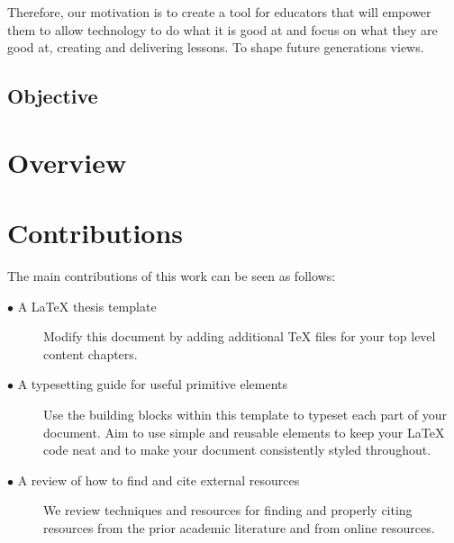	Therefore, our motivation is to create a tool for educators that will empower them to allow technology to do what it is good at and focus on what they are good at, creating and delivering lessons. To shape future generations views.


	\subsection{Objective}
		\label{sec:intro_objective} 



	\section{Overview}  
		\label{sec:intro_overview} 



	\section{Contributions} 
		\label{sec:intro_contribs} 

The main contributions of this work can be seen as follows:

		\begin{description}	

			\item[\(\bullet\) A \LaTeX{} thesis template]\hfill

Modify this document by adding additional \TeX{} files for your top level content chapters. 

			\item[\(\bullet\) A typesetting guide for useful primitive elements]\hfill

Use the building blocks within this template to typeset each part of your document.
Aim to use simple and reusable elements to keep your \LaTeX{} code neat and to make your document consistently styled throughout.

			\item[\(\bullet\) A review of how to find and cite external resources]\hfill

We review techniques and resources for finding and properly citing resources from the prior academic literature and from online resources.

		\end{description}